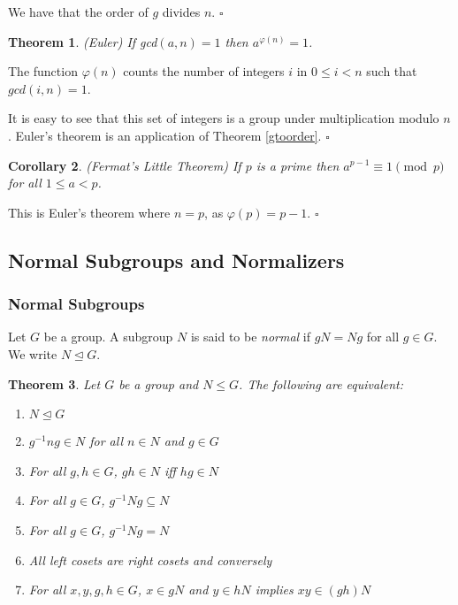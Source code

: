 \documentclass[10pt]{article}
\newtheorem{theorem}{Theorem}[section]
\newtheorem{corollary}[theorem]{Corollary}
\newenvironment{proof}[1][Proof]{\begin{trivlist}
\item[\hskip \labelsep {\itshape #1}]}{\end{trivlist}}
\newenvironment{definition}[1][Definition]{\begin{trivlist}
\item[\hskip \labelsep {\bfseries #1}]}{\end{trivlist}}
\begin{document}
\begin{proof}
We have that the order of $g$ divides $n$. $\square$
\end{proof}

\begin{theorem} (Euler)
If gcd$(a, n) = 1$ then $a^{\varphi(n)} = 1$.
\end{theorem}

\begin{proof}
The function $\varphi(n)$ counts the number of integers $i$ in $0 \leq i < n$ such that $gcd(i, n) = 1$.

It is easy to see that this set of integers is a group under multiplication modulo $n$. Euler's theorem is an application of Theorem \ref{gtoorder}. $\square$
\end{proof}

\begin{corollary} (Fermat's Little Theorem)
If $p$ is a prime then $a^{p-1} \equiv 1 \pmod{p}$ for all $1 \leq a < p$.
\end{corollary}

\begin{proof}
This is Euler's theorem where $n = p$, as $\varphi(p) = p - 1$. $\square$
\end{proof}

\subsection{Normal Subgroups and Normalizers}

\subsubsection{Normal Subgroups}

\begin{definition}
Let $G$ be a group. A subgroup $N$ is said to be \emph{normal} if $gN = Ng$ for all $g \in G$. We write $N \mathrel{\unlhd} G$.
\end{definition}

\begin{theorem}\label{equivnormal}
Let $G$ be a group and $N \leq G$. The following are equivalent:
\begin{enumerate}
\item $N \mathrel{\unlhd} G$
\item $g^{-1}ng \in N$ for all $n \in N$ and $g \in G$
\item For all $g, h \in G$, $gh \in N$ iff $hg \in N$
\item For all $g \in G$, $g^{-1}Ng \subseteq N$
\item For all $g \in G$, $g^{-1}Ng = N$
\item All left cosets are right cosets and conversely
\item For all $x, y, g, h \in G$, $x \in gN$ and $y \in hN$ implies $xy \in (gh)N$
\end{enumerate}
\end{theorem}
\end{document}

